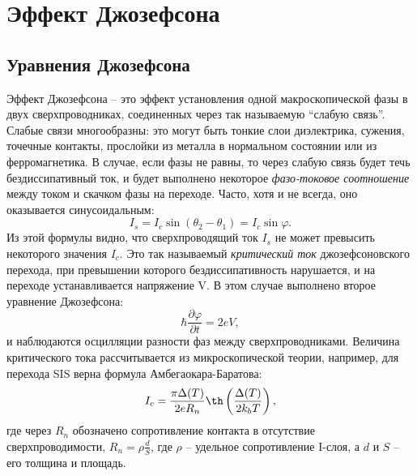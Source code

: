 \documentclass[12pt]{article}
\numberwithin{equation}{section}
\begin{document}
\section{Эффект Джозефсона}
\subsection{Уравнения Джозефсона}
Эффект Джозефсона\cite{Josephson1964} -- это эффект установления одной макроскопической фазы в двух сверхпроводниках, соединенных через так называемую ``слабую связь''. Слабые связи многообразны: это могут быть тонкие слои диэлектрика, сужения, точечные контакты, прослойки из металла в нормальном состоянии или из ферромагнетика. В случае, если фазы не равны, то через слабую связь будет течь бездиссипативный ток, и будет выполнено некоторое \textit{фазо-токовое соотношение} между током и скачком фазы на переходе. Часто, хотя и не всегда\cite{Golubov2004}, оно оказывается синусоидальным:
\begin{equation}
I_s = I_c \sin(\theta_2 - \theta_1) = I_c \sin\varphi.
\label{eq:CPR}
\end{equation}
Из этой формулы видно, что сверхпроводящий ток $I_s$ не может превысить некоторого значения $I_c$. Это так называемый \textit{критический ток} джозефсоновского перехода, при превышении которого бездиссипативность нарушается, и на переходе устанавливается напряжение V. В этом случае выполнено второе уравнение Джозефсона:
\begin{equation}
\hbar \frac{\partial \varphi}{\partial t} = 2eV,
\label{eq:2JE}
\end{equation}
и наблюдаются осцилляции разности фаз между сверхпроводниками. Величина критического тока рассчитывается из микроскопической теории, например, для перехода SIS верна формула Амбегаокара-Баратова:
\begin{equation}
I_c = \frac{\pi\Delta(T)}{2eR_n}\th\left(\frac{\Delta(T)}{2k_bT}\right),
\label{eq:Ic}
\end{equation}
где через $R_n$ обозначено сопротивление контакта в отсутствие сверхпроводимости, $R_n = \rho\frac{d}{S}$, где $\rho$ -- удельное сопротивление I-слоя, а $d$ и $S$ -- его толщина и площадь.
\end{document}
